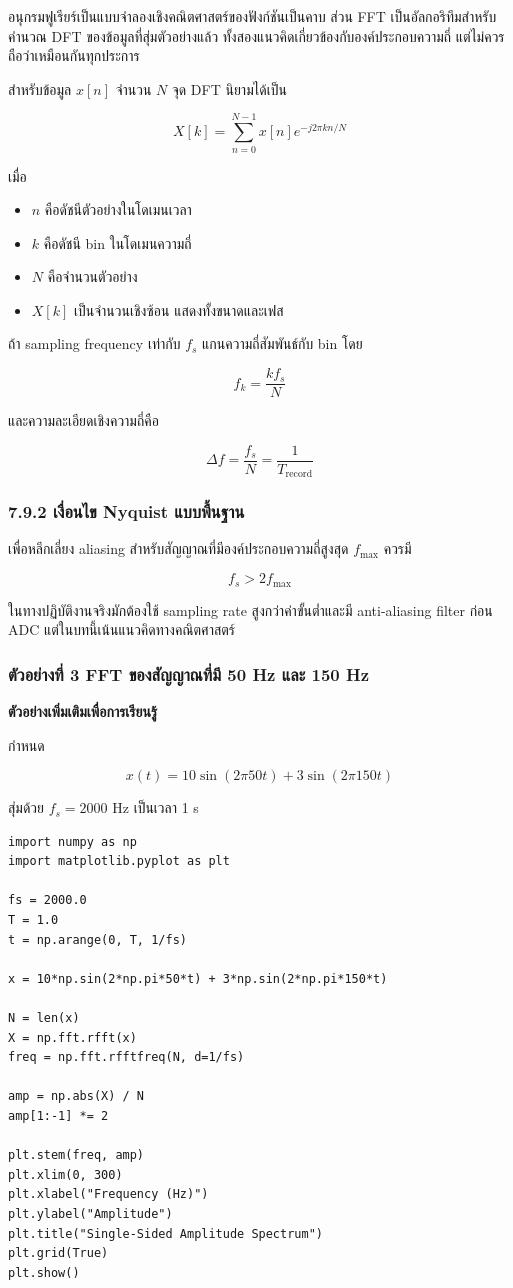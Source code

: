 อนุกรมฟูเรียร์เป็นแบบจำลองเชิงคณิตศาสตร์ของฟังก์ชันเป็นคาบ ส่วน FFT เป็นอัลกอริทึมสำหรับคำนวณ DFT ของข้อมูลที่สุ่มตัวอย่างแล้ว ทั้งสองแนวคิดเกี่ยวข้องกับองค์ประกอบความถี่ แต่ไม่ควรถือว่าเหมือนกันทุกประการ

สำหรับข้อมูล $x[n]$ จำนวน $N$ จุด DFT นิยามได้เป็น

\[
X[k]=\sum_{n=0}^{N-1}x[n]e^{-j2\pi kn/N}
\]

เมื่อ

\begin{itemize}
    \item $n$ คือดัชนีตัวอย่างในโดเมนเวลา
    \item $k$ คือดัชนี bin ในโดเมนความถี่
    \item $N$ คือจำนวนตัวอย่าง
    \item $X[k]$ เป็นจำนวนเชิงซ้อน แสดงทั้งขนาดและเฟส
\end{itemize}

ถ้า sampling frequency เท่ากับ $f_s$ แกนความถี่สัมพันธ์กับ bin โดย

\[
f_k=\frac{k f_s}{N}
\]

และความละเอียดเชิงความถี่คือ

\[
\Delta f=\frac{f_s}{N}=\frac{1}{T_{\text{record}}}
\]

\subsubsection{7.9.2 เงื่อนไข Nyquist แบบพื้นฐาน}

เพื่อหลีกเลี่ยง aliasing สำหรับสัญญาณที่มีองค์ประกอบความถี่สูงสุด $f_{\max}$ ควรมี

\[
f_s>2f_{\max}
\]

ในทางปฏิบัติงานจริงมักต้องใช้ sampling rate สูงกว่าค่าขั้นต่ำและมี anti-aliasing filter ก่อน ADC แต่ในบทนี้เน้นแนวคิดทางคณิตศาสตร์

\subsubsection{ตัวอย่างที่ 3 FFT ของสัญญาณที่มี 50 Hz และ 150 Hz}

\textbf{ตัวอย่างเพิ่มเติมเพื่อการเรียนรู้}

กำหนด

\[
x(t)=10\sin(2\pi50t)+3\sin(2\pi150t)
\]

สุ่มด้วย $f_s=2000$ Hz เป็นเวลา 1 s

\begin{verbatim}
import numpy as np
import matplotlib.pyplot as plt

fs = 2000.0
T = 1.0
t = np.arange(0, T, 1/fs)

x = 10*np.sin(2*np.pi*50*t) + 3*np.sin(2*np.pi*150*t)

N = len(x)
X = np.fft.rfft(x)
freq = np.fft.rfftfreq(N, d=1/fs)

amp = np.abs(X) / N
amp[1:-1] *= 2

plt.stem(freq, amp)
plt.xlim(0, 300)
plt.xlabel("Frequency (Hz)")
plt.ylabel("Amplitude")
plt.title("Single-Sided Amplitude Spectrum")
plt.grid(True)
plt.show()
\end{verbatim}

